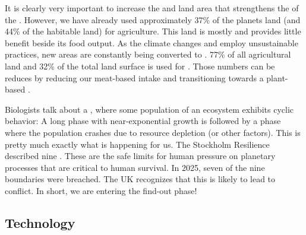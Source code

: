 It is clearly very important to increase the  and land area that strengthens the  of the . However, we have already used approximately 37\% of the planets land (and 44\% of the habitable land) for agriculture. This land is mostly  and provides little benefit beside its food output. As the climate changes and  employ unsustainable practices, new areas are constantly being converted to . 77\% of all agricultural land and 32\% of the total land surface is used for \cite{doi:10.1126/science.aaq0216}. Those numbers can  be reduces by reducing our meat-based intake and transitioning towards a plant-based .

Biologists talk about a , where some population of an ecosystem exhibits cyclic behavior: A long  phase with near-exponential growth is followed by a  phase where the population crashes due to resource depletion (or other factors). This is pretty much exactly what is happening for us. The Stockholm Resilience described nine \cite{Rockstrm2009}. These are the safe limits for human pressure on planetary processes that are critical to human survival. In 2025, seven of the nine boundaries were breached. The UK recognizes that this is likely to lead to conflict\cite{defra2026global}. In short, we are entering the find-out phase!

\subsection{Technology}

